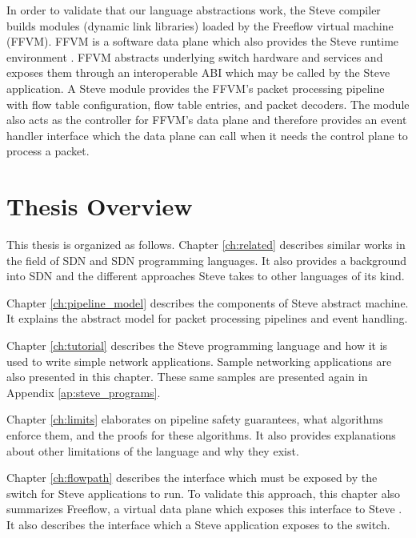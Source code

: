 
In order to validate that our language abstractions work, the Steve compiler builds modules (dynamic link libraries)
loaded by the Freeflow virtual machine (FFVM).
FFVM is a software data plane which also provides the Steve runtime environment \cite{freeflow_software}.
FFVM abstracts underlying switch
hardware and services and exposes them through an interoperable ABI which may be called by the Steve application.
A Steve module provides the FFVM's packet processing pipeline with
flow table configuration, flow table entries, and packet decoders.
The module also acts as the controller for FFVM's data plane and therefore provides an event handler interface which the data plane can call when it needs the control plane to process a packet.

\section{Thesis Overview}

This thesis is organized as follows. Chapter \ref{ch:related} describes similar
works in the field of SDN and SDN programming languages. It also provides a
background into SDN and the different approaches Steve takes to other languages
of its kind.

Chapter \ref{ch:pipeline_model} describes the components of Steve abstract machine. It explains the abstract model for packet processing pipelines and event handling.

Chapter \ref{ch:tutorial} describes the Steve programming language and how it is used to write simple network applications.
Sample networking applications are also presented in
this chapter. These same samples are presented again in Appendix
\ref{ap:steve_programs}.

Chapter \ref{ch:limits} elaborates on pipeline safety guarantees, what algorithms enforce them, and the proofs for these algorithms. It also provides explanations about other
limitations of the language and why they exist.

Chapter \ref{ch:flowpath} describes the interface which must be exposed by the switch for Steve applications to run. To validate this approach, this chapter also summarizes Freeflow, a virtual data plane which exposes this interface to Steve \cite{freeflow_software}. It also describes the interface which a Steve application exposes to the switch.


